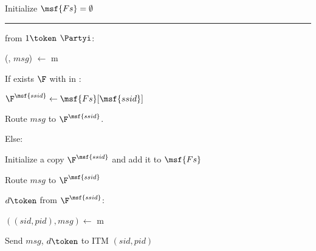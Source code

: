 \begin{bbox}[title={Multisession $!\F$}]

Initialize $\msf{Fs} = \emptyset$

\vspace{2mm}
\hrule
\vspace{2mm}

\OnInput {} from \color{red} $1 \token$ \color{black} $\Partyi$:
\begin{renumerate}
\item (, $msg$) $\leftarrow$ m
\item If exists $\F$ with  in :

	\qquad $\F^{\msf{ssid}} \leftarrow \msf{Fs}[\msf{ssid}]$

	\qquad Route $msg$ to $\F^{\msf{ssid}}$.

\item Else:

	\qquad Initialize a copy $\F^{\msf{ssid}}$ and add it to $\msf{Fs}$

	\qquad Route $msg$ to $\F^{\msf{ssid}}$
\end{renumerate}

\OnInput {} \color{red} $d \token$ \color{black} from $\F^{\msf{ssid}}$:
\begin{renumerate}
\item $((sid,pid), msg) \leftarrow$ m
\item Send $msg$, \color{red} $d \token$ \color{black} to ITM $(sid,pid)$
\end{renumerate}

\end{bbox}
